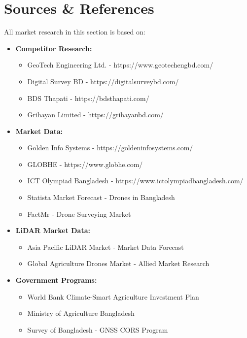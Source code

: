 \section{Sources \& References}

All market research in this section is based on:

\begin{itemize}
    \item \textbf{Competitor Research:}
    \begin{itemize}
        \item GeoTech Engineering Ltd. - https://www.geotechengbd.com/
        \item Digital Survey BD - https://digitalsurveybd.com/
        \item BDS Thapati - https://bdsthapati.com/
        \item Grihayan Limited - https://grihayanbd.com/
    \end{itemize}

    \item \textbf{Market Data:}
    \begin{itemize}
        \item Golden Info Systems - https://goldeninfosystems.com/
        \item GLOBHE - https://www.globhe.com/
        \item ICT Olympiad Bangladesh - https://www.ictolympiadbangladesh.com/
        \item Statista Market Forecast - Drones in Bangladesh
        \item FactMr - Drone Surveying Market
    \end{itemize}

    \item \textbf{LiDAR Market Data:}
    \begin{itemize}
        \item Asia Pacific LiDAR Market - Market Data Forecast
        \item Global Agriculture Drones Market - Allied Market Research
    \end{itemize}

    \item \textbf{Government Programs:}
    \begin{itemize}
        \item World Bank Climate-Smart Agriculture Investment Plan
        \item Ministry of Agriculture Bangladesh
        \item Survey of Bangladesh - GNSS CORS Program
    \end{itemize}
\end{itemize}


